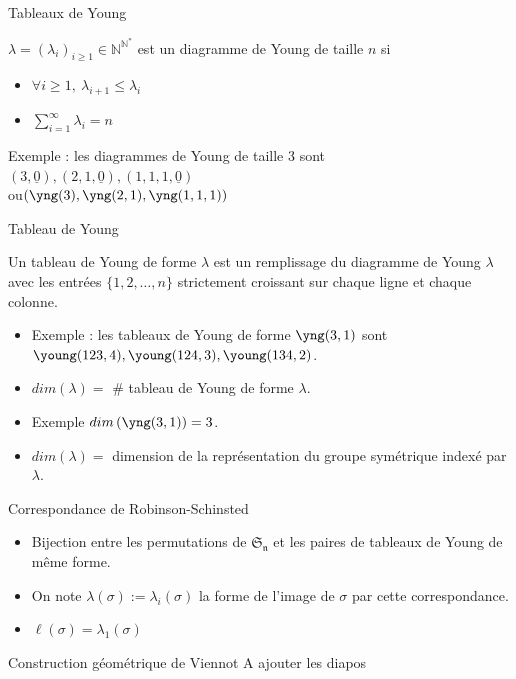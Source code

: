 \documentclass[french]{beamer}
\begin{document}
\begin{frame}{Tableaux de Young}
   \begin{definition}
   $\lambda=(\lambda_i)_{i\geq1} \in \mathbb{N}^{\mathbb{N}^*}$ est un diagramme de Young de taille $n$ si 
   \begin{itemize}
       \item $\forall i\geq1, \  \lambda_{i+1}\leq \lambda_i$
       \item $\sum_{i=1}^\infty \lambda_i=n$
   \end{itemize}
   \end{definition}
   Exemple : les diagrammes de Young de taille 3 sont $(3,\underline{0}),(2,1,\underline{0}),(1,1,1,\underline{0})$
   \\   ou$\left(\yng(3),\yng(2,1),\yng(1,1,1)\right)$
   
 
\end{frame}
\begin{frame}{Tableau de Young}
    \begin{definition}
    Un tableau de Young de forme $\lambda$ est un remplissage du diagramme de Young $\lambda$ avec les entrées $\{1,2,\dots,n\}$ strictement croissant sur chaque ligne et chaque colonne. 
    \end{definition}
    \begin{itemize}
        \item     Exemple : les tableaux de Young de forme $\yng(3,1)$ sont $\young(123,4),\young(124,3),\young(134,2)$. 
    \item$dim(\lambda)=$ \# tableau de Young de forme $\lambda$. 
    \item Exemple  $dim\left(\yng(3,1)\right)=3$.
    \item $dim(\lambda) = $   dimension de  la représentation du groupe symétrique indexé par $\lambda$.
    \end{itemize}
 \end{frame}


\begin{frame}{Correspondance de Robinson-Schinsted}
\begin{itemize}
    \item Bijection entre les permutations de $\mathfrak{S_n}$ et les paires de  tableaux de Young de même forme. 
    \item On note $\lambda(\sigma):=\lambda_i(\sigma)$ la forme de l'image de $\sigma$ par cette correspondance. 
    \item $\ell(\sigma)=\lambda_1(\sigma)$
\end{itemize}    
\end{frame}
\begin{frame}{Construction géométrique de Viennot}
 A ajouter les diapos   
\end{frame}
\end{document}
